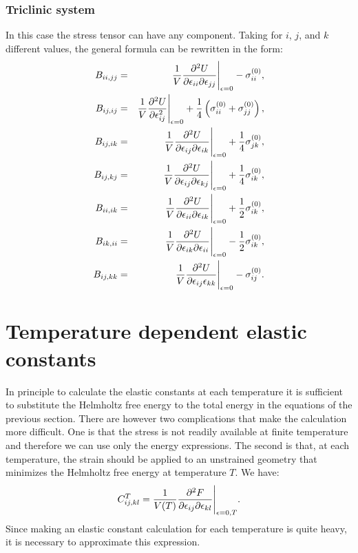 \documentclass[12pt,a4paper,twoside]{report}
\begin{document}
{\color{web-blue}\subsection{Triclinic system}}
\color{black}

In this case the stress tensor can have any component. 
Taking for $i$, $j$, and $k$ different values, the general formula can 
be rewritten in the form:
\begin{eqnarray}
B_{ii,jj} &=& {1 \over V}{\partial^2 U \over \partial \epsilon_{ii}
\partial \epsilon_{jj}}\Bigg|_{\epsilon=0} - \sigma^{(0)}_{ii}, \\
B_{ij,ij} &=& {1 \over V}{\partial^2 U \over \partial \epsilon_{ij}^2 
}\Bigg|_{\epsilon=0} + {1\over 4} \left(\sigma^{(0)}_{ii} 
+ \sigma^{(0)}_{jj}\right), \\
B_{ij,ik} &=& {1 \over V}{\partial^2 U \over \partial \epsilon_{ij} 
\partial \epsilon_{ik}}\Bigg|_{\epsilon=0} +{1\over 4}\sigma^{(0)}_{jk}, \\
B_{ij,kj} &=& {1 \over V}{\partial^2 U \over \partial \epsilon_{ij} 
\partial \epsilon_{kj}}\Bigg|_{\epsilon=0} +{1\over 4} \sigma^{(0)}_{ik}, \\
B_{ii,ik} &=& {1 \over V}{\partial^2 U \over \partial \epsilon_{ii} 
\partial \epsilon_{ik}}\Bigg|_{\epsilon=0} +{1\over 2} \sigma^{(0)}_{ik}, \\
B_{ik,ii} &=& {1 \over V}{\partial^2 U \over \partial \epsilon_{ik} 
\partial \epsilon_{ii}}\Bigg|_{\epsilon=0} -{1\over 2} \sigma^{(0)}_{ik}, \\
B_{ij,kk} &=& {1 \over V}{\partial^2 U \over \partial \epsilon_{ij}
\epsilon_{kk} }\Bigg|_{\epsilon=0} - \sigma^{(0)}_{ij}. 
\end{eqnarray}

\newpage
{\color{dark-blue}\chapter{Temperature dependent elastic constants}}
\color{black}

In principle to calculate the elastic constants at each temperature it
is sufficient to substitute the Helmholtz free energy to the total energy
in the equations of the previous section. 
There are however two complications
that make the calculation more difficult. One is that the stress is not
readily available at finite temperature and therefore we can use only the
energy expressions. The second is that, at each temperature, the strain should
be applied to an unstrained geometry that minimizes the Helmholtz free energy 
at temperature $T$. 
We have:
\begin{equation}
C_{ij,kl}^T= {1 \over V(T)}{\partial^2 F \over \partial \epsilon_{ij} 
\partial \epsilon_{kl}}\Bigg|_{\epsilon=0,T}.
\end{equation}
Since making an elastic constant calculation for each temperature is
quite heavy, it is necessary to approximate this expression.
\end{document}
